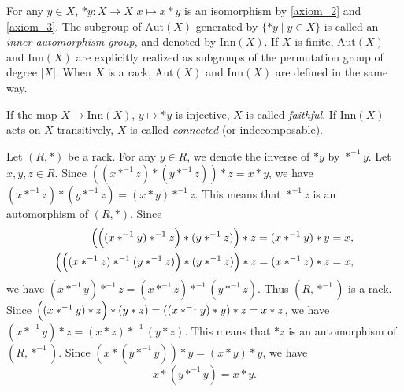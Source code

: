 \documentclass{amsart}
\theoremstyle{definition}
\theoremstyle{remark}
\numberwithin{equation}{section}
\begin{document}
For any $y \in X$, $*y : X \to X$ $x \mapsto x*y$ is 
an isomorphism by \ref{axiom_2} and  \ref{axiom_3}.
The subgroup of $\mathrm{Aut}(X)$ generated by $\{ *y \mid y \in X\}$ 
is called an \emph{inner automorphism group}, and denoted by $\mathrm{Inn} (X)$.
If $X$ is finite, $\mathrm{Aut}(X)$ and $\mathrm{Inn}(X)$ are explicitly realized as 
subgroups of the permutation group of degree $|X|$.
When $X$ is a rack, 
$\mathrm{Aut}(X)$ and $\mathrm{Inn}(X)$ are defined in the same way.

If the map $X \to \mathrm{Inn} (X)$, $y \mapsto *y$ is injective, 
$X$ is called \emph{faithful}.
If $\mathrm{Inn}(X)$ acts on $X$ transitively, $X$ is called \emph{connected} 
(or indecomposable).

Let $(R,*)$ be a rack.
For any $y \in R$, we denote the inverse of $*y$ by $*^{-1}y$. 
Let $x, y, z \in R$.
Since $( (x *^{-1} z ) * (y *^{-1} z) ) * z  = x * y$, 
we have $(x *^{-1} z ) * (y *^{-1} z) = (x * y) *^{-1} z$.
This means that $*^{-1} z$ is an automorphism of $(R, *)$.
Since 
\[
\begin{split}
\Bigl( \Bigl( (x *^{-1} y ) *^{-1} z \Bigr) * (y *^{-1} z) \Bigr) * z 
= (x *^{-1} y) * y = x, \\
\Bigl( \Bigl( (x *^{-1} z ) *^{-1} (y *^{-1} z) \Bigr) * (y *^{-1} z) \Bigr) * z  
= (x *^{-1} z) * z = x, 
\end{split}
\]
we have $(x *^{-1} y ) *^{-1} z = (x *^{-1} z ) *^{-1} (y *^{-1} z)$. 
Thus $(R, *^{-1})$ is a rack.
Since $ \Bigl( ( x *^{-1} y) * z \Bigr) * (y*z) =  ( ( x *^{-1} y) * y ) * z  = x *z$,  
we have $( x *^{-1} y) * z = (x*z) *^{-1} (y * z)$. 
This means that $*z$ is an automorphism of $(R, *^{-1})$.
Since $(x * (y*^{-1}y) ) * y  = (x*y ) * y$, we have
\begin{equation}
\label{eq:fiber}
x * (y*^{-1}y)  = x*y. 
\end{equation}
\end{document}
